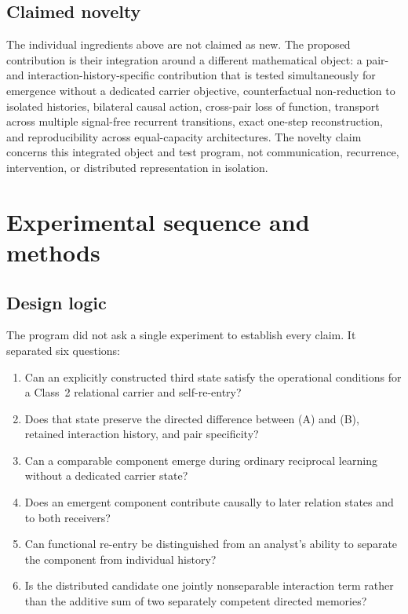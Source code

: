 \documentclass[11pt,a4paper]{article}
\begin{document}
\subsection{Claimed novelty}

The individual ingredients above are not claimed as new. The proposed contribution is their integration around a different mathematical object: a pair- and interaction-history-specific contribution that is tested simultaneously for emergence without a dedicated carrier objective, counterfactual non-reduction to isolated histories, bilateral causal action, cross-pair loss of function, transport across multiple signal-free recurrent transitions, exact one-step reconstruction, and reproducibility across equal-capacity architectures. The novelty claim concerns this integrated object and test program, not communication, recurrence, intervention, or distributed representation in isolation.

\section{Experimental sequence and methods}

\subsection{Design logic}

The program did not ask a single experiment to establish every claim. It separated six questions:
\begin{enumerate}
  \item Can an explicitly constructed third state satisfy the operational conditions for a Class~2 relational carrier and self-re-entry?
  \item Does that state preserve the directed difference between (A) and (B), retained interaction history, and pair specificity?
  \item Can a comparable component emerge during ordinary reciprocal learning without a dedicated carrier state?
  \item Does an emergent component contribute causally to later relation states and to both receivers?
  \item Can functional re-entry be distinguished from an analyst's ability to separate the component from individual history?
  \item Is the distributed candidate one jointly nonseparable interaction term rather than the additive sum of two separately competent directed memories?
\end{enumerate}
\end{document}
